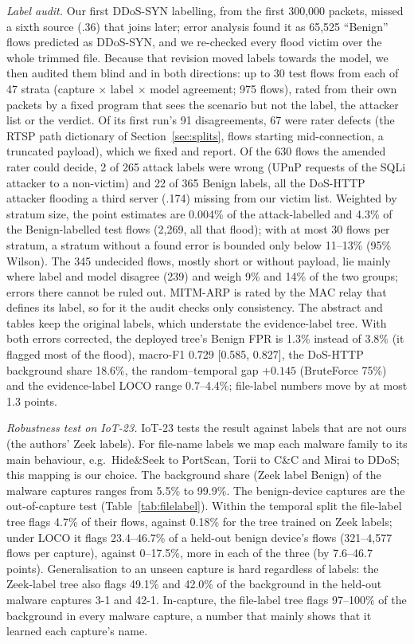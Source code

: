 \emph{Label audit.} Our first DDoS-SYN labelling, from the first 300,000 packets, missed a sixth source (.36) that joins later; error analysis found it as 65,525 ``Benign'' flows predicted as DDoS-SYN, and we re-checked every flood victim over the whole trimmed file. Because that revision moved labels towards the model, we then audited them blind and in both directions: up to 30 test flows from each of 47 strata (capture $\times$ label $\times$ model agreement; 975 flows), rated from their own packets by a fixed program that sees the scenario but not the label, the attacker list or the verdict. Of its first run's 91 disagreements, 67 were rater defects (the RTSP path dictionary of Section~\ref{sec:splits}, flows starting mid-connection, a truncated payload), which we fixed and report. Of the 630 flows the amended rater could decide, 2 of 265 attack labels were wrong (UPnP requests of the SQLi attacker to a non-victim) and 22 of 365 Benign labels, all the DoS-HTTP attacker flooding a third server (.174) missing from our victim list. Weighted by stratum size, the point estimates are 0.004\% of the attack-labelled and 4.3\% of the Benign-labelled test flows (2,269, all that flood); with at most 30 flows per stratum, a stratum without a found error is bounded only below 11--13\% (95\% Wilson). The 345 undecided flows, mostly short or without payload, lie mainly where label and model disagree (239) and weigh 9\% and 14\% of the two groups; errors there cannot be ruled out. MITM-ARP is rated by the MAC relay that defines its label, so for it the audit checks only consistency. The abstract and tables keep the original labels, which understate the evidence-label tree. With both errors corrected, the deployed tree's Benign FPR is 1.3\% instead of 3.8\% (it flagged most of the flood), macro-F1 0.729 [0.585, 0.827], the DoS-HTTP background share 18.6\%, the random--temporal gap $+0.145$ (BruteForce 75\%) and the evidence-label LOCO range 0.7--4.4\%; file-label numbers move by at most 1.3 points.

\emph{Robustness test on IoT-23.} IoT-23 tests the result against labels that are not ours (the authors' Zeek labels). For file-name labels we map each malware family to its main behaviour, e.g.\ Hide\&Seek to PortScan, Torii to C\&C and Mirai to DDoS; this mapping is our choice. The background share (Zeek label Benign) of the malware captures ranges from 5.5\% to 99.9\%. The benign-device captures are the out-of-capture test (Table~\ref{tab:filelabel}). Within the temporal split the file-label tree flags 4.7\% of their flows, against 0.18\% for the tree trained on Zeek labels; under LOCO it flags 23.4--46.7\% of a held-out benign device's flows (321--4,577 flows per capture), against 0--17.5\%, more in each of the three (by 7.6--46.7 points). Generalisation to an unseen capture is hard regardless of labels: the Zeek-label tree also flags 49.1\% and 42.0\% of the background in the held-out malware captures 3-1 and 42-1. In-capture, the file-label tree flags 97--100\% of the background in every malware capture, a number that mainly shows that it learned each capture's name.

